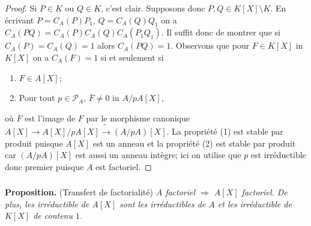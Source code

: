 \documentclass[a4paper, 12pt]{amsart}
\begin{document}
\begin{proof}Si $P\in K$ ou $Q\in K$, c'est clair. Supposons donc $P,Q\in K[X]\setminus K$. En \'ecrivant $P=C_A(P)P_1$, $Q=C_A(Q)Q_1$ on a $C_A(PQ)=C_A(P)C_A(Q)C_A(P_1Q_1)$. Il suffit donc de montrer que si $C_A(P)=C_A(Q)=1$ alors $C_A(PQ)=1$. Observons que pour $F\in K[X]$ in $K[X]$ on a  $C_A(F)=1$ si et seulement si
\begin{enumerate}
\item $F\in A[X]$;
\item  Pour tout $p\in\mathcal{P}_A$, $\overline{F}\not=0$ in $A/pA[X]$, 
\end{enumerate}
o\`u $\overline{F}$ est l'image de $F$ par le morphisme canonique $A[X]\rightarrow A[X]/pA[X]\tilde{\rightarrow} (A/pA)[X]$. La propri\'et\'e (1) est  stable par produit puisque $A[X]$ est un anneau et la propri\'et\'e (2) est stable par produit car $(A/pA)[X]$ est aussi un anneau int\`egre; ici on utilise que $p$ est irr\'eductible donc premier puisque $A$ est factoriel.\end{proof}
%
%



\subsubsection{}\label{FactTransfert}\textbf{Proposition.} (Transfert de factorialit\'e) \textit{$A$ factoriel $\Rightarrow$ $A[X]$ factoriel. De plus, les  irr\'eductible de $A[X]$ sont les irr\'eductibles de $A$ et les irr\'eductible de $K[X]$ de contenu $1$.}\\
\end{document}
